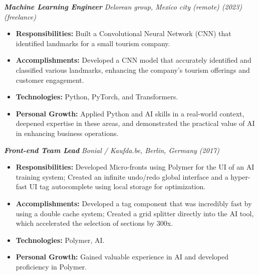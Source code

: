 \documentclass[a4paper,10pt]{article}
\begin{document}
\begin{minipage}[t]{0.65\textwidth}
\begin{minipage}[t]{\dimexpr\linewidth-25px}
    \vspace{1cm}

    \textbf{\textit{Machine Learning Engineer}}
    \textit{\small Delorean group, Mexico city (remote) (2023) (freelance)}
    \vspace{0.3cm}
    \begin{itemize}[leftmargin=*]
        \item \textbf{Responsibilities:} Built a Convolutional Neural Network (CNN) that identified landmarks for a small
    tourism company.
        \item \textbf{Accomplishments:} Developed a CNN model that accurately identified and classified various
    landmarks, enhancing the company's tourism offerings and customer engagement.
        \item \textbf{Technologies:} Python, PyTorch, and Transformers.
        \item \textbf{Personal Growth:} Applied Python and AI skills in a real-world context, deepened expertise in these
    areas, and demonstrated the practical value of AI in enhancing business operations.
    \end{itemize}

    \vspace{1cm}

    \textbf{\textit{Front-end Team Lead}}
    \textit{\small Bonial / Kaufda.be, Berlin, Germany (2017)}
    \vspace{0.3cm}
    \begin{itemize}[leftmargin=*]
        \item \textbf{Responsibilities:} Developed Micro-fronts using Polymer for the UI of an AI training system; Created
    an infinite undo/redo global interface and a hyper-fast UI tag autocomplete using local storage for
    optimization.
        \item \textbf{Accomplishments:} Developed a tag component that was incredibly fast by using a double cache
    system; Created a grid splitter directly into the AI tool, which accelerated the selection of sections by
    300x.
        \item \textbf{Technologies:} Polymer, AI.
        \item \textbf{Personal Growth:} Gained valuable experience in AI and developed proficiency in Polymer.
    \end{itemize}
\end{minipage}\hspace{5px}
\end{minipage}%
\end{document}
